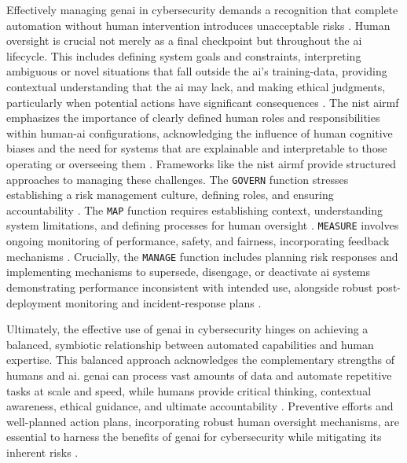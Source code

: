 Effectively managing \gls{genai} in cybersecurity demands a recognition that complete automation without human intervention introduces unacceptable risks \cite{patel_generative_2025}. Human oversight is crucial not merely as a final checkpoint but throughout the \gls{ai} lifecycle. This includes defining system goals and constraints, interpreting ambiguous or novel situations that fall outside the \gls{ai}'s \gls{training-data}, providing contextual understanding that the \gls{ai} may lack, and making ethical judgments, particularly when potential actions have significant consequences \cite{tabassi_artificial_2023}. The \gls{nist} \gls{airmf} emphasizes the importance of clearly defined human roles and responsibilities within human-\gls{ai} configurations, acknowledging the influence of human cognitive biases and the need for systems that are explainable and interpretable to those operating or overseeing them \cite{tabassi_artificial_2023}.
Frameworks like the \gls{nist} \gls{airmf} provide structured approaches to managing these challenges. The \texttt{GOVERN} function stresses establishing a risk management culture, defining roles, and ensuring accountability \cite[p. 21-24]{tabassi_artificial_2023}. The \texttt{MAP} function requires establishing context, understanding system limitations, and defining processes for human oversight \cite[p. 24-28]{tabassi_artificial_2023}. \texttt{MEASURE} involves ongoing monitoring of performance, safety, and fairness, incorporating feedback mechanisms \cite[p. 28-31]{tabassi_artificial_2023}. Crucially, the \texttt{MANAGE} function includes planning risk responses and implementing mechanisms to supersede, disengage, or deactivate \gls{ai} systems demonstrating performance inconsistent with intended use, alongside robust post-deployment monitoring and \gls{incident-response} plans \cite[p. 31-33]{tabassi_artificial_2023}.

Ultimately, the effective use of \gls{genai} in cybersecurity hinges on achieving a balanced, symbiotic relationship between automated capabilities and human expertise. This balanced approach acknowledges the complementary strengths of humans and \gls{ai}. \gls{genai} can process vast amounts of data and automate repetitive tasks at scale and speed, while humans provide critical thinking, contextual awareness, ethical guidance, and ultimate accountability \cite{patel_generative_2025}. Preventive efforts and well-planned action plans, incorporating robust human oversight mechanisms, are essential to harness the benefits of \gls{genai} for cybersecurity while mitigating its inherent risks \cite{patel_generative_2025}.

